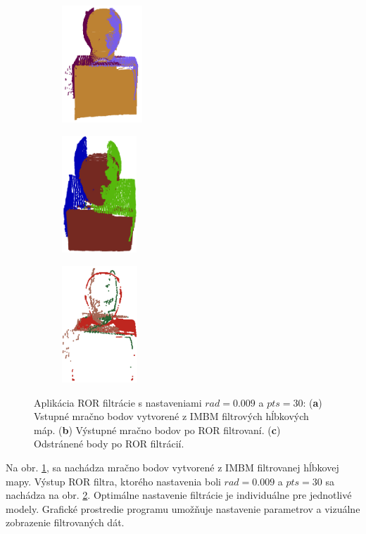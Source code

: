 \begin{figure}[h]
	\centering
	\begin{subfigure}[b]{0.32\textwidth}
		\centering
		\includegraphics[height=4.4cm]{figures/model_colors.png}
		\caption{}
		\label{fig:ror:a}
	\end{subfigure}
	\hfill
	\begin{subfigure}[b]{0.32\textwidth}
		\centering
		\includegraphics[height=4.4cm]{figures/ror_preserv.png}
		\caption{}
		\label{fig:ror:b}
	\end{subfigure}
	\hfill
	\begin{subfigure}[b]{0.32\textwidth}
		\centering
		\includegraphics[height=4.4cm]{figures/ror_rem.png}
		\caption{}
		\label{fig:ror:c}
	\end{subfigure}
	\caption{Aplikácia ROR filtrácie s nastaveniami $rad=0.009$ a  $pts=30$: (\textbf{a}) Vstupné mračno bodov vytvorené z IMBM filtrových hĺbkových máp. (\textbf{b}) Výstupné mračno bodov po ROR filtrovaní. (\textbf{c}) Odstránené body po ROR filtrácií.}
	\label{fig:ror}
\end{figure}

Na obr. \ref{fig:ror:a}, sa nachádza mračno bodov vytvorené z IMBM filtrovanej hĺbkovej mapy. Výstup ROR filtra, ktorého nastavenia boli $rad=0.009$ a $pts=30$ sa nachádza na obr. \ref{fig:ror:b}. Optimálne nastavenie filtrácie je individuálne pre jednotlivé modely. Grafické prostredie programu umožňuje nastavenie parametrov a vizuálne zobrazenie filtrovaných dát. 

